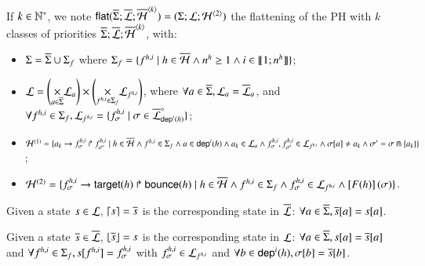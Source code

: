 \begin{definition}
  \label{def:flattening}
  If $k \in \mathbb{N}^*$, we note $\mathsf{flat}(\overline{\Sigma}; \overline{\mathcal{L}}; \overline{\mathcal{H}}^{{\langle k \rangle}}) = (\Sigma; \mathcal{L}; \mathcal{H}^{{\langle 2 \rangle}})$
  the flattening of the PH with $k$ classes of priorities $\overline{\Sigma}; \overline{\mathcal{L}}; \overline{\mathcal{H}}^{{\langle k \rangle}}$, with:
  \begin{itemize}
    \item $\Sigma = \overline{\Sigma} \cup \Sigma_f$
      where $\Sigma_f = \{ f^{h,i} \mid h \in \overline{\mathcal{H}} \wedge n^{h} \geq 1 \wedge i \in \llbracket 1; n^{h} \rrbracket \}$;
    \item $\mathcal{L} = \left( \underset{a \in \overline{\Sigma}}{\times} \mathcal{L}_{a} \right) \times
      \left(\underset{f^{h,i} \in \Sigma_f}{\times} \mathcal{L}_{f^{h,i}} \right)$,
      where $\forall a \in \overline{\Sigma}, \mathcal{L}_{a} = \overline{\mathcal{L}}_{a}$, and
      $\forall f^{h,i} \in \Sigma_f,
      \mathcal{L}_{f^{h,i}} = \{ f^{h,i}_\sigma \mid \sigma \in \overline{\mathcal{L}}^\diamond_{\mathsf{dep}^{i}(h)} \}$;
    \item $\mathcal{H}^{(1)} = \{ a_k\rightarrow f^{h,i}_\sigma\Rsh f^{h,i}_{\sigma'} \mid
      h \in \overline{\mathcal{H}} \wedge
      f^{h,i} \in \Sigma_f \wedge
      a \in \mathsf{dep}^{i}(h) \wedge a_k \in \mathcal{L}_a \wedge
      f^{h,i}_\sigma , f^{h,i}_{\sigma'} \in \mathcal{L}_{f^{h,i}} \wedge
      {\sigma[a]} \neq a_k \wedge \sigma' = \sigma \Cap \{ a_k \} \}$;
    \item $\mathcal{H}^{(2)}=\{ f^{h,i}_\sigma\rightarrow\mathsf{target}(h)\Rsh\mathsf{bounce}(h) \mid
      h \in \overline{\mathcal{H}} \wedge 
      f^{h,i} \in \Sigma_f \wedge
      f^{h,i}_\sigma \in \mathcal{L}_{f^{h,i}} \wedge \left[F(h)\right](\sigma) \}$.
  \end{itemize}
  Given a state $s \in \mathcal{L}$, $\lceil s \rceil = \overline{s}$ is the corresponding state in $\overline{\mathcal{L}}$:
  $\forall a \in \overline{\Sigma}, {\overline{s}[a]} = {s[a]}$.

  \noindent
  Given a state $\overline{s} \in \overline{\mathcal{L}}$, $\lfloor \overline{s} \rfloor = s$ is the corresponding state in $\mathcal{L}$:
  $\forall a \in \overline{\Sigma}, {s[a]} = {\overline{s}[a]}$
  and $\forall f^{h,i} \in \Sigma_f, {s[f^{h,i}]} = f^{h,i}_\sigma$ with $f^{h,i}_\sigma \in \mathcal{L}_{f^{h,i}}$
  and $\forall b \in \mathsf{dep}^{i}(h), {\sigma[b]} = {\overline{s}[b]}$.
\end{definition}

